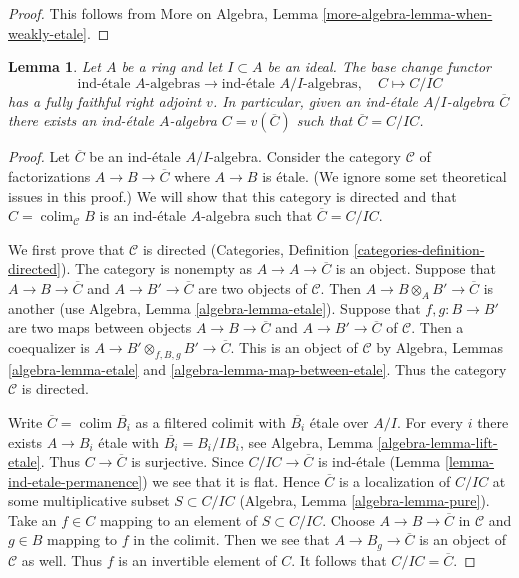 \documentclass{stacks-project}
\theoremstyle{plain}
\newtheorem{lemma}[subsection]{Lemma}
\theoremstyle{definition}
\theoremstyle{remark}
\numberwithin{equation}{subsection}
\def\colim{\mathop{\mathrm{colim}}\nolimits}
\begin{document}
\begin{proof}
This follows from More on Algebra, Lemma
\ref{more-algebra-lemma-when-weakly-etale}.
\end{proof}

\begin{lemma}
\label{lemma-lift-ind-etale}
Let $A$ be a ring and let $I \subset A$ be an ideal. The base change functor
$$
\text{ind-\'etale }A\text{-algebras}
\longrightarrow
\text{ind-\'etale }A/I\text{-algebras},\quad
C \longmapsto C/IC
$$
has a fully faithful right adjoint $v$. In particular, given
an ind-\'etale $A/I$-algebra $\overline{C}$ there exists
an ind-\'etale $A$-algebra $C = v(\overline{C})$ such that
$\overline{C} = C/IC$.
\end{lemma}

\begin{proof}
Let $\overline{C}$ be an ind-\'etale $A/I$-algebra.
Consider the category $\mathcal{C}$ of factorizations
$A \to B \to \overline{C}$ where $A \to B$ is \'etale.
(We ignore some set theoretical issues in this proof.)
We will show that this category is directed and that
$C = \colim_\mathcal{C} B$ is an ind-\'etale $A$-algebra
such that $\overline{C} = C/IC$.

\medskip\noindent
We first prove that $\mathcal{C}$ is directed
(Categories, Definition \ref{categories-definition-directed}).
The category is nonempty as $A \to A \to \overline{C}$ is an object.
Suppose that $A \to B \to \overline{C}$ and $A \to B' \to \overline{C}$
are two objects of $\mathcal{C}$. Then $A \to B \otimes_A B' \to \overline{C}$
is another (use Algebra, Lemma \ref{algebra-lemma-etale}).
Suppose that $f, g : B \to B'$ are two maps between
objects $A \to B \to \overline{C}$ and $A \to B' \to \overline{C}$
of $\mathcal{C}$. Then a coequalizer is
$A \to B' \otimes_{f, B, g} B' \to \overline{C}$.
This is an object of $\mathcal{C}$ by
Algebra, Lemmas \ref{algebra-lemma-etale} and
\ref{algebra-lemma-map-between-etale}.
Thus the category $\mathcal{C}$ is directed.

\medskip\noindent
Write $\overline{C} = \colim \overline{B_i}$ as a filtered colimit with
$\overline{B_i}$ \'etale over $A/I$. For every $i$
there exists $A \to B_i$ \'etale with $\overline{B_i} = B_i/IB_i$, see
Algebra, Lemma \ref{algebra-lemma-lift-etale}.
Thus $C \to \overline{C}$ is surjective.
Since $C/IC \to \overline{C}$ is ind-\'etale
(Lemma \ref{lemma-ind-etale-permanence})
we see that it is flat. Hence $\overline{C}$ is a localization of
$C/IC$ at some multiplicative subset $S \subset C/IC$
(Algebra, Lemma \ref{algebra-lemma-pure}).
Take an $f \in C$ mapping to an element of $S \subset C/IC$.
Choose $A \to B \to \overline{C}$ in $\mathcal{C}$ and $g \in B$
mapping to $f$ in the colimit. Then we see that $A \to B_g \to \overline{C}$
is an object of $\mathcal{C}$ as well. Thus $f$ is an invertible
element of $C$. It follows that $C/IC = \overline{C}$.


\end{proof}
\end{document}
